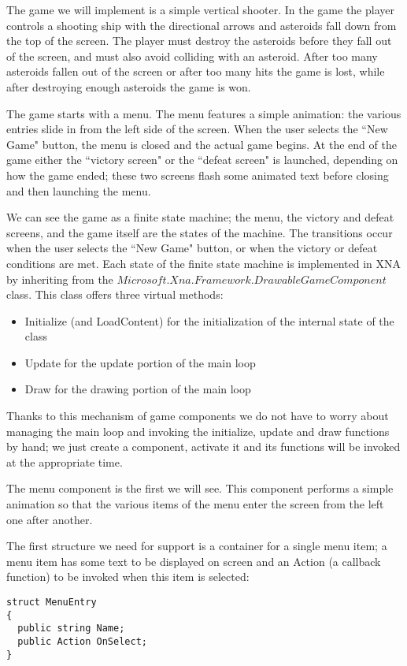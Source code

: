 
The game we will implement is a simple vertical shooter. In the game the player controls a shooting ship with the directional arrows and asteroids fall down from the top of the screen. The player must destroy the asteroids before they fall out of the screen, and must also avoid colliding with an asteroid. After too many asteroids fallen out of the screen or after too many hits the game is lost, while after destroying enough asteroids the game is won.

The game starts with a menu. The menu features a simple animation: the various entries slide in from the left side of the screen. When the user selects the ``New Game" button, the menu is closed and the actual game begins. At the end of the game either the ``victory screen" or the ``defeat screen" is launched, depending on how the game ended; these two screens flash some animated text before closing and then launching the menu.

We can see the game as a finite state machine; the menu, the victory and defeat screens, and the game itself are the states of the machine. The transitions occur when the user selects the ``New Game" button, or when the victory or defeat conditions are met. Each state of the finite state machine is implemented in XNA by inheriting from the $Microsoft.Xna.Framework.DrawableGameComponent$ class. This class offers three virtual methods:
\begin{itemize}
\item Initialize (and LoadContent) for the initialization of the internal state of the class
\item Update for the update portion of the main loop
\item Draw for the drawing portion of the main loop
\end{itemize}

Thanks to this mechanism of game components we do not have to worry about managing the main loop and invoking the initialize, update and draw functions by hand; we just create a component, activate it and its functions will be invoked at the appropriate time.

The menu component is the first we will see. This component performs a simple animation so that the various items of the menu enter the screen from the left one after another.

The first structure we need for support is a container for a single menu item; a menu item has some text to be displayed on screen and an Action (a callback function) to be invoked when this item is selected:
\begin{lstlisting}
struct MenuEntry
{
  public string Name;
  public Action OnSelect;
}
\end{lstlisting}

